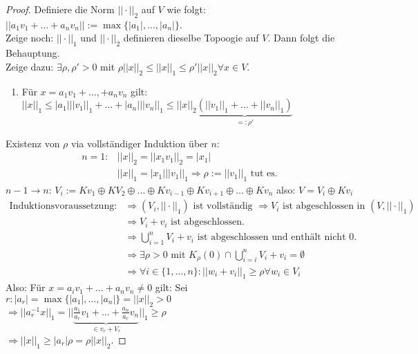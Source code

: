 \begin{proof}
Definiere die Norm $||\cdot||_2$ auf $V$ wie folgt: $||a_1 v_1+ \dots + a_nv_n||:=\max\{|a_1|, \dots, |a_n|\}$.\\
Zeige noch: $||\cdot ||_1$ und $||\cdot ||_2$ definieren dieselbe Topoogie auf $V$. Dann folgt die Behauptung.\\
Zeige dazu: $\exists\rho, \rho' >0$ mit $\rho ||x||_2 \leq ||x||_1 \leq \rho'||x||_2 \forall x \in V$.
\begin{enumerate}[(1)]
\item Für $x=a_1 v_1+ \dots, +a_n v_n$ gilt: $||x||_1 \leq |a_1| ||v_1||_1+ \dots + |a_n| ||v_n||_1 \leq ||x||_2 \underbrace{(||v_1||_1+ \dots + ||v_n||_1)}_{=:\rho'}$
\end{enumerate}
\item Existenz von $\rho$ via vollständiger Induktion über $n$:\\
\begin{align*}
n=1: &||x||_2=||x_1v_1||_2=|x_1|\\
&||x||_1=|x_1| ||v_1||_1 \Rightarrow \rho:=||v_1||_1 \text{ tut es.}
\end{align*}
\glqq $n-1 \to n $\grqq: $V_i:= Kv_1 \oplus KV_2 \oplus \dots \oplus Kv_{i-1} \oplus Kv_{i+1} \oplus \dots \oplus Kv_n$
also: $V=V_i \oplus Kv_i$\\
\begin{align*}
\text{Induktionsvoraussetzung:} &\Rightarrow (V_i, ||\cdot ||_1) \text{ ist vollständig } \Rightarrow V_i \text{ ist abgeschlossen in }(V, ||\cdot ||_1)\\
&\Rightarrow V_i +v_i \text{ ist abgeschlossen.}\\
&\Rightarrow \bigcup_{i=1}^n V_i +v_i \text{ ist abgeschlossen und enthält nicht } 0.\\
&\Rightarrow \exists \rho > 0 \text{ mit } K_\rho(0) \cap \bigcup_{i=i}^n V_i+v_i = \emptyset\\
&\Rightarrow \forall i \in \{1, \dots, n\}: ||w_i+v_i||_1 \geq \rho \forall w_i \in V_i
\end{align*}
Also: Für $x=a_iv_1 + \dots + a_nv_n \neq 0$ gilt:
Sei $r : |a_r|=\max\{|a_1|, \dots, |a_n|\}=||x||_2>0$\\
$\Rightarrow ||a_r^{-1} x||_1 = ||\underbrace{\frac{a_1}{a_r}v_1 + \dots + \frac{a_n}{a_r}v_n}_{\in v_r+V_r}||_1 \geq \rho$\\
$\Rightarrow ||x||_1 \geq |a_r| \rho =\rho ||x||_2.$
\end{proof}
